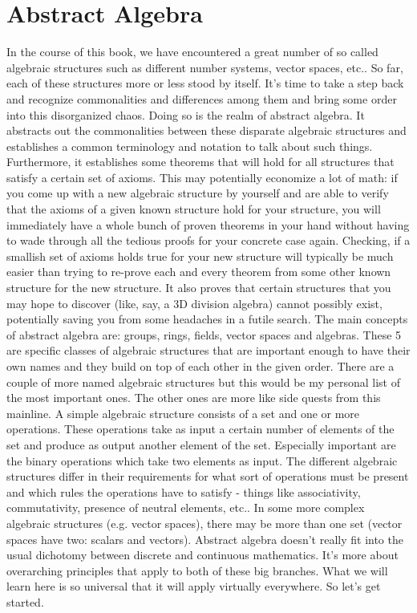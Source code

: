 \chapter{Abstract Algebra}
In the course of this book, we have encountered a great number of so called algebraic structures such as different number systems, vector spaces, etc.. So far, each of these structures more or less stood by itself. It's time to take a step back and recognize commonalities and differences among them and bring some order into this disorganized chaos. Doing so is the realm of abstract algebra. It abstracts out the commonalities between these disparate algebraic structures and establishes a common terminology and notation to talk about such things. Furthermore, it establishes some theorems that will hold for all structures that satisfy a certain set of axioms. This may potentially economize a lot of math: if you come up with a new algebraic structure by yourself and are able to verify that the axioms of a given known structure hold for your structure, you will immediately have a whole bunch of proven theorems in your hand without having to wade through all the tedious proofs for your concrete case again. Checking, if a smallish set of axioms holds true for your new structure will typically be much easier than trying to re-prove each and every theorem from some other known structure for the new structure. It also proves that certain structures that you may hope to discover (like, say, a 3D division algebra) cannot possibly exist, potentially saving you from some headaches in a futile search. The main concepts of abstract algebra are: groups, rings, fields, vector spaces and algebras. These 5 are specific classes of algebraic structures that are important enough to have their own names and they build on top of each other in the given order. There are a couple of more named algebraic structures but this would be my personal list of the most important ones. The other ones are more like side quests from this mainline. A simple algebraic structure consists of a set and one or more operations. These operations take as input a certain number of elements of the set and produce as output another element of the set. Especially important are the binary operations which take two elements as input. The different algebraic structures differ in their requirements for what sort of operations must be present and which rules the operations have to satisfy - things like associativity, commutativity, presence of neutral elements, etc.. In some more complex algebraic structures (e.g. vector spaces), there may be more than one set (vector spaces have two: scalars and vectors). Abstract algebra doesn't really fit into the usual dichotomy between discrete and continuous mathematics. It's more about overarching principles that apply to both of these big branches. What we will learn here is so universal that it will apply virtually everywhere. So let's get started.

